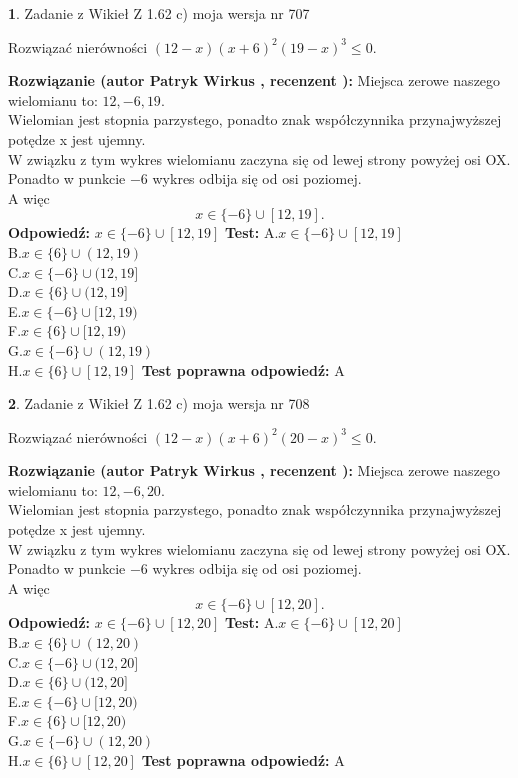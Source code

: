 \documentclass[12pt, a4paper]{article}
\theoremstyle{definition} %
\newtheorem{zad}{}
\newcommand{\zadStart}[1]{\begin{zad}#1\newline}
\newcommand{\zadStop}{\end{zad}}
\newcommand{\rozwStart}[2]{\noindent \textbf{Rozwiązanie (autor #1 , recenzent #2): }\newline}
\newcommand{\rozwStop}{\newline}
\newcommand{\odpStart}{\noindent \textbf{Odpowiedź:}\newline}
\newcommand{\odpStop}{\newline}
\newcommand{\testStart}{\noindent \textbf{Test:}\newline}
\newcommand{\testStop}{\newline}
\newcommand{\kluczStart}{\noindent \textbf{Test poprawna odpowiedź:}\newline}
\newcommand{\kluczStop}{\newline}
\begin{document}
\zadStart{Zadanie z Wikieł Z 1.62 c) moja wersja nr 707}

Rozwiązać nierówności $(12-x)(x+6)^{2}(19-x)^{3}\le0$.
\zadStop
\rozwStart{Patryk Wirkus}{}
Miejsca zerowe naszego wielomianu to: $12, -6, 19$.\\
Wielomian jest stopnia parzystego, ponadto znak współczynnika przy\linebreak najwyższej potędze x jest ujemny.\\ W związku z tym wykres wielomianu zaczyna się od lewej strony powyżej osi OX.\\
Ponadto w punkcie $-6$ wykres odbija się od osi poziomej.\\
A więc $$x \in \{-6\} \cup [12,19].$$
\rozwStop
\odpStart
$x \in \{-6\} \cup [12,19]$
\odpStop
\testStart
A.$x \in \{-6\} \cup [12,19]$\\
B.$x \in \{6\} \cup (12,19)$\\
C.$x \in \{-6\} \cup (12,19]$\\
D.$x \in \{6\} \cup (12,19]$\\
E.$x \in \{-6\} \cup [12,19)$\\
F.$x \in \{6\} \cup [12,19)$\\
G.$x \in \{-6\} \cup (12,19)$\\
H.$x \in \{6\} \cup [12,19]$
\testStop
\kluczStart
A
\kluczStop



\zadStart{Zadanie z Wikieł Z 1.62 c) moja wersja nr 708}

Rozwiązać nierówności $(12-x)(x+6)^{2}(20-x)^{3}\le0$.
\zadStop
\rozwStart{Patryk Wirkus}{}
Miejsca zerowe naszego wielomianu to: $12, -6, 20$.\\
Wielomian jest stopnia parzystego, ponadto znak współczynnika przy\linebreak najwyższej potędze x jest ujemny.\\ W związku z tym wykres wielomianu zaczyna się od lewej strony powyżej osi OX.\\
Ponadto w punkcie $-6$ wykres odbija się od osi poziomej.\\
A więc $$x \in \{-6\} \cup [12,20].$$
\rozwStop
\odpStart
$x \in \{-6\} \cup [12,20]$
\odpStop
\testStart
A.$x \in \{-6\} \cup [12,20]$\\
B.$x \in \{6\} \cup (12,20)$\\
C.$x \in \{-6\} \cup (12,20]$\\
D.$x \in \{6\} \cup (12,20]$\\
E.$x \in \{-6\} \cup [12,20)$\\
F.$x \in \{6\} \cup [12,20)$\\
G.$x \in \{-6\} \cup (12,20)$\\
H.$x \in \{6\} \cup [12,20]$
\testStop
\kluczStart
A
\kluczStop
\end{document}
